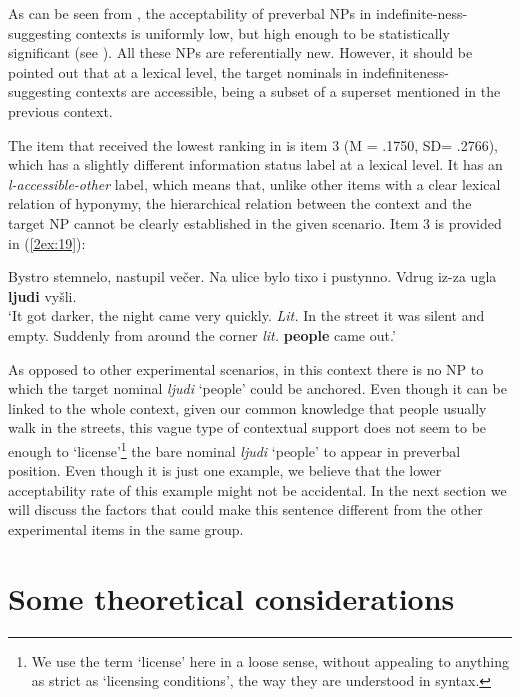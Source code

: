 \documentclass[output=paper]{langsci/langscibook}
\begin{document}
As can be seen from , the acceptability of preverbal NPs in indefinite-ness-suggesting contexts is uniformly low, but high enough to be statistically significant (see ). All these NPs are referentially new. However, it should be pointed out that at a lexical level, the target nominals in indefiniteness-sugges\-ting contexts are accessible, being a subset of a superset mentioned in the previous context.

The item that received the lowest ranking in  is item 3 (M = .1750, SD= .2766), which has a slightly different information status label at a lexical level. It has an {\emph{l-accessible-other}} label, which means that, unlike other items with a clear lexical relation of hyponymy, the hierarchical relation between the context and the target NP cannot be clearly established in the given scenario. Item 3 is provided in (\ref{2ex:19}):

\begin{exe}
\ex\label{2ex:19}
Bystro stemnelo, nastupil ve\v{c}er. Na ulice bylo tixo i pustynno. Vdrug iz-za ugla {\textbf{ljudi}} vy\v{s}li. \\
`It got darker, the night came very quickly. 
{\emph{Lit.}} In the street it was silent and empty. Suddenly from around the corner {\emph{lit.}} {\textbf{people}} came out.'
\end{exe}

As opposed to other experimental scenarios, in this context there is no NP to which the target nominal {\emph{ljudi}} `people' could be anchored. Even though it can be linked to the whole context, given our common knowledge that people usually walk in the streets, this vague type of contextual support does not seem to be enough to `license'\footnote{We use the term `license' here in a loose sense, without appealing to anything as strict as `licensing conditions', the way they are understood in syntax.} the bare nominal {\emph{ljudi}} `people' to appear in preverbal position. Even though it is just one example, we believe that the lower acceptability rate of this example might not be accidental. In the next section we will discuss the factors that could make this sentence different from the other experimental items in the same group.


\section{Some theoretical considerations}\label{2sec:4}
\end{document}
